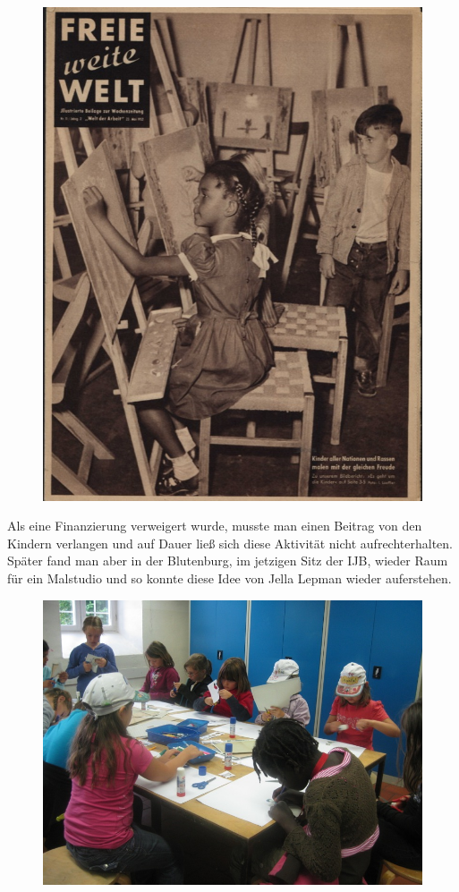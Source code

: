 \documentclass[a4paper,
fontsize=11pt,
oneside,
numbers=noperiodatend,
parskip=half-,
bibliography=totoc,
final
]{scrartcl}
\begin{document}
\begin{figure}[htbp]
\centering
\includegraphics{img/bild9.jpg}
\end{figure}

Als eine Finanzierung verweigert wurde, musste man einen Beitrag von den
Kindern verlangen und auf Dauer ließ sich diese Aktivität nicht
aufrechterhalten. Später fand man aber in der Blutenburg, im jetzigen
Sitz der IJB, wieder Raum für ein Malstudio und so konnte diese Idee von
Jella Lepman wieder auferstehen.

\begin{figure}[htbp]
\centering
\includegraphics{img/bild10.jpg}
\end{figure}
\end{document}
